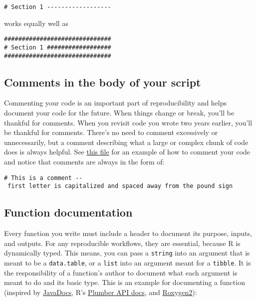 \documentclass[]{book}
\begin{document}
\begin{verbatim}
# Section 1 ------------------
\end{verbatim}

works equally well as

\begin{verbatim}
##############################
# Section 1 ##################
##############################
\end{verbatim}

\hypertarget{comments-in-the-body-of-your-script}{%
\subsection{Comments in the body of your script}\label{comments-in-the-body-of-your-script}}

Commenting your code is an important part of reproducibility and helps document your code for the future. When things change or break, you'll be thankful for comments. When you revisit code you wrote two years earlier, you'll be thankful for comments. There's no need to comment excessively or unnecessarily, but a comment describing what a large or complex chunk of code does is always helpful. See \href{https://github.com/kmishra9/Flu-Absenteeism/blob/master/Master's\%20Thesis\%20-\%20Spatial\%20Epidemiology\%20of\%20Influenza/1b\%20-\%20Map-Management.R}{this file} for an example of how to comment your code and notice that comments are always in the form of:

\texttt{\#\ This\ is\ a\ comment\ -\/-\ first\ letter\ is\ capitalized\ and\ spaced\ away\ from\ the\ pound\ sign}

\hypertarget{function-documentation}{%
\subsection{Function documentation}\label{function-documentation}}

Every function you write must include a header to document its purpose, inputs, and outputs. For any reproducible workflows, they are essential, because R is dynamically typed. This means, you can pass a \texttt{string} into an argument that is meant to be a \texttt{data.table}, or a \texttt{list} into an argument meant for a \texttt{tibble}. It is the responsibility of a function's author to document what each argument is meant to do and its basic type. This is an example for documenting a function (inspired by \href{https://www.oracle.com/technetwork/java/javase/documentation/index-137868.html\#format}{JavaDocs}, R's \href{https://blog.rstudio.com/2018/10/23/rstudio-1-2-preview-plumber-integration/}{Plumber API docs}, and \href{https://kbroman.org/pkg_primer/pages/docs.html}{Roxygen2}):
\end{document}
